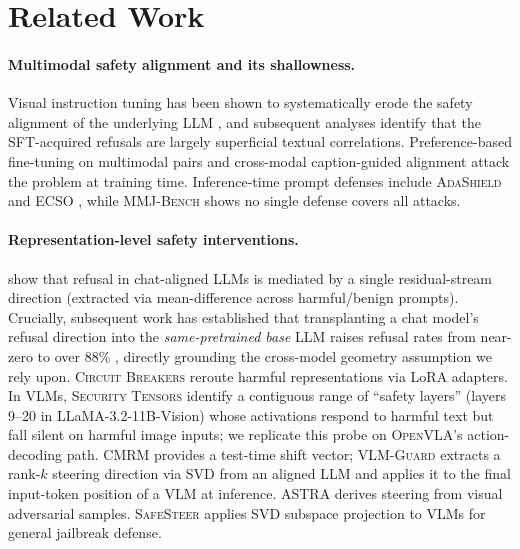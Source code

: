 \section{Related Work}
\label{sec:related}

\paragraph{Multimodal safety alignment and its shallowness.}
Visual instruction tuning has been shown to systematically erode the safety alignment of the underlying LLM \citep{vlguard2024}, and subsequent analyses \citep{safemirage2025} identify that the SFT-acquired refusals are largely superficial textual correlations. Preference-based fine-tuning on multimodal pairs \citep{spavl2024} and cross-modal caption-guided alignment \citep{cmrt2025} attack the problem at training time. Inference-time prompt defenses include \textsc{AdaShield} \citep{adashield2024} and \textsc{ECSO} \citep{ecso2024}, while \textsc{MMJ-Bench} \citep{mmjbench2024} shows no single defense covers all attacks.

\paragraph{Representation-level safety interventions.}
\citet{arditi2024refusal} show that refusal in chat-aligned LLMs is mediated by a single residual-stream direction (extracted via mean-difference across harmful/benign prompts). Crucially, subsequent work has established that transplanting a chat model's refusal direction into the \emph{same-pretrained base} LLM raises refusal rates from near-zero to over 88\% \citep{baselmsrefuse2024}, directly grounding the cross-model geometry assumption we rely upon. \textsc{Circuit Breakers} \citep{circuitbreakers2024} reroute harmful representations via LoRA adapters. In VLMs, \textsc{Security Tensors} \citep{securitytensors2025} identify a contiguous range of ``safety layers'' (layers 9--20 in LLaMA-3.2-11B-Vision) whose activations respond to harmful text but fall silent on harmful image inputs; we replicate this probe on \textsc{OpenVLA}'s action-decoding path. \textsc{CMRM} \citep{cmrm2025} provides a test-time shift vector; \textsc{VLM-Guard} \citep{vlmguard2025} extracts a rank-$k$ steering direction via SVD from an aligned LLM and applies it to the final input-token position of a VLM at inference. \textsc{ASTRA} \citep{astra2025} derives steering from visual adversarial samples. \textsc{SafeSteer} \citep{safesteer2025} applies SVD subspace projection to VLMs for general jailbreak defense.

